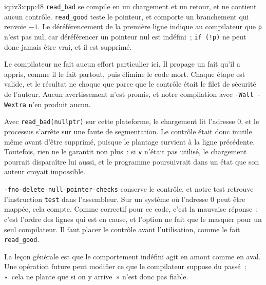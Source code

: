 \begin{solution}{iq:iv3:cpp:48}
\texttt{read\_bad} se compile en un chargement et un retour, et ne contient aucun contrôle. \texttt{read\_good} teste le pointeur, et comporte un branchement qui renvoie $-1$. Le déréférencement de la première ligne indique au compilateur que \texttt{p} n'est pas nul, car déréférencer un pointeur nul est indéfini~; \texttt{if (!p)} ne peut donc jamais être vrai, et il est supprimé.

Le compilateur ne fait aucun effort particulier ici. Il propage un fait qu'il a appris, comme il le fait partout, puis élimine le code mort. Chaque étape est valide, et le résultat ne choque que parce que le contrôle était le filet de sécurité de l'auteur. Aucun avertissement n'est promis, et notre compilation avec \texttt{-Wall -Wextra} n'en produit aucun.

Avec \texttt{read\_bad(nullptr)} sur cette plateforme, le chargement lit l'adresse 0, et le processus s'arrête sur une faute de segmentation. Le contrôle était donc inutile même avant d'être supprimé, puisque le plantage survient à la ligne précédente. Toutefois, rien ne le garantit non plus~: si \texttt{v} n'était pas utilisé, le chargement pourrait disparaître lui aussi, et le programme poursuivrait dans un état que son auteur croyait impossible.

\texttt{-fno-delete-null-pointer-checks} conserve le contrôle, et notre test retrouve l'instruction \texttt{test} dans l'assembleur. Sur un système où l'adresse 0 peut être mappée, cela compte. Comme correctif pour ce code, c'est la mauvaise réponse~: c'est l'ordre des lignes qui est en cause, et l'option ne fait que le masquer pour un seul compilateur. Il faut placer le contrôle avant l'utilisation, comme le fait \texttt{read\_good}.

La leçon générale est que le comportement indéfini agit en amont comme en aval. Une opération future peut modifier ce que le compilateur suppose du passé~; «~cela ne plante que si on y arrive~» n'est donc pas fiable.

\end{solution}

